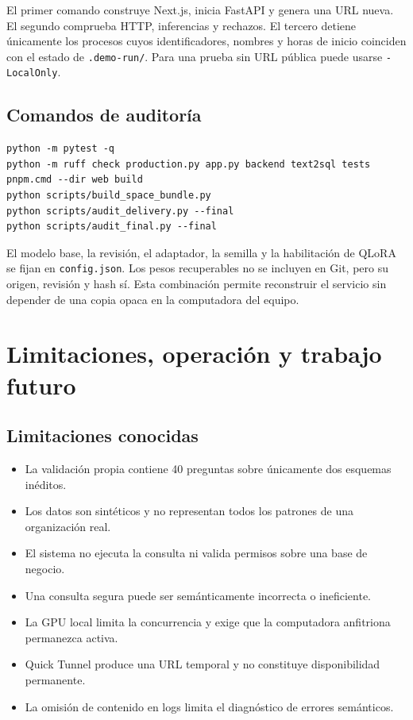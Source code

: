 \documentclass[11pt,letterpaper]{article}
\newcommand{\code}[1]{\texttt{#1}}
\begin{document}
El primer comando construye Next.js, inicia FastAPI y genera una URL nueva. El segundo comprueba
HTTP, inferencias y rechazos. El tercero detiene únicamente los procesos cuyos identificadores,
nombres y horas de inicio coinciden con el estado de \code{.demo-run/}. Para una prueba sin URL
pública puede usarse \code{-LocalOnly}.

\subsection{Comandos de auditoría}

\begin{verbatim}
python -m pytest -q
python -m ruff check production.py app.py backend text2sql tests
pnpm.cmd --dir web build
python scripts/build_space_bundle.py
python scripts/audit_delivery.py --final
python scripts/audit_final.py --final
\end{verbatim}

El modelo base, la revisión, el adaptador, la semilla y la habilitación de QLoRA se fijan en
\code{config.json}. Los pesos recuperables no se incluyen en Git, pero su origen, revisión y hash sí.
Esta combinación permite reconstruir el servicio sin depender de una copia opaca en la computadora
del equipo.

\section{Limitaciones, operación y trabajo futuro}

\subsection{Limitaciones conocidas}

\begin{itemize}
  \item La validación propia contiene 40 preguntas sobre únicamente dos esquemas inéditos.
  \item Los datos son sintéticos y no representan todos los patrones de una organización real.
  \item El sistema no ejecuta la consulta ni valida permisos sobre una base de negocio.
  \item Una consulta segura puede ser semánticamente incorrecta o ineficiente.
  \item La GPU local limita la concurrencia y exige que la computadora anfitriona permanezca activa.
  \item Quick Tunnel produce una URL temporal y no constituye disponibilidad permanente.
  \item La omisión de contenido en logs limita el diagnóstico de errores semánticos.
\end{itemize}
\end{document}
